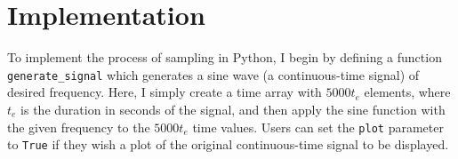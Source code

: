 \documentclass{article}
\begin{document}



\section{Implementation}


To implement the process of sampling in Python, I begin by defining a function \verb|generate_signal| which generates a sine wave (a continuous-time signal) of desired frequency.
Here, I simply create a time array with $5000t_e$ elements, where $t_e$ is the duration in seconds of the signal, 
and then apply the sine function with the given frequency to the $5000 t_e$ time values. 
Users can set the \verb|plot| parameter to \verb|True| if they wish a plot of the original continuous-time signal to be displayed.
\end{document}
